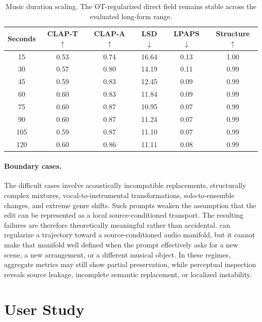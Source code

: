 \begin{table}[t]
    \centering
    \small
    \setlength{\tabcolsep}{2.1pt}
    \begin{tabular}{@{}cccccc@{}}
        \toprule
        \textbf{Seconds} & \textbf{CLAP-T} $\uparrow$ & \textbf{CLAP-A} $\uparrow$ & \textbf{LSD} $\downarrow$ & \textbf{LPAPS} $\downarrow$ & \textbf{Structure} $\uparrow$ \\
        \midrule
        15  & 0.53 & 0.74 & 16.64 & 0.13 & 1.00 \\
        30  & 0.57 & 0.80 & 14.19 & 0.11 & 0.99 \\
        45  & 0.59 & 0.83 & 12.45 & 0.09 & 0.99 \\
        60  & 0.60 & 0.83 & 11.84 & 0.09 & 0.99 \\
        75  & 0.60 & 0.87 & 10.95 & 0.07 & 0.99 \\
        90  & 0.60 & 0.87 & 11.24 & 0.07 & 0.99 \\
        105 & 0.59 & 0.87 & 11.10 & 0.07 & 0.99 \\
        120 & 0.60 & 0.86 & 11.11 & 0.08 & 0.99 \\
        \bottomrule
    \end{tabular}
    \caption{Music duration scaling. The OT-regularized direct field remains stable across the evaluated long-form range.}
    \label{tab:duration_app}
\end{table}

\paragraph{Boundary cases.}
\label{app:limitation_subset}
The difficult cases involve acoustically incompatible replacements, structurally complex mixtures, vocal-to-instrumental transformations, solo-to-ensemble changes, and extreme genre shifts.
Such prompts weaken the assumption that the edit can be represented as a local source-conditioned transport.
The resulting failures are therefore theoretically meaningful rather than accidental.
\methodplus can regularize a trajectory toward a source-conditioned audio manifold, but it cannot make that manifold well defined when the prompt effectively asks for a new scene, a new arrangement, or a different musical object.
In these regimes, aggregate metrics may still show partial preservation, while perceptual inspection reveals source leakage, incomplete semantic replacement, or localized instability.

\section{User Study}
\label{app:user_study}


